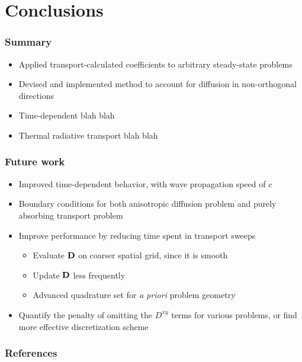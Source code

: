 \documentclass{beamer}
\newcommand{\Dtens}{\mat{D}}
\begin{document}
\section{Conclusions}
\begin{frame}
  \frametitle{Summary}
  \begin{itemize}
    \item Applied transport-calculated coefficients to arbitrary steady-state
      problems
    \item Devised and implemented method to account for diffusion in
      non-orthogonal directions
    \item Time-dependent blah blah
    \item Thermal radiative transport blah blah
  \end{itemize}
\end{frame}
\begin{frame}
  \frametitle{Future work}
  \begin{itemize}
    \item Improved time-dependent behavior, with wave propagation speed of $c$
    \item Boundary conditions for both anisotropic diffusion problem and
      purely absorbing transport problem
    \item Improve performance by reducing time spent in transport sweeps
      \begin{itemize}
        \item Evaluate $\Dtens$ on coarser spatial grid, since it is smooth
        \item Update $\Dtens$ less frequently
        \item Advanced quadrature set for \emph{a priori} problem geometry
      \end{itemize}
    \item Quantify the penalty of omitting the $D^{xy}$ terms for various
      problems, or find more effective discretization scheme
  \end{itemize}
\end{frame}
\appendix
\begin{frame}
  \frametitle{References}


\end{frame}

\end{document}
